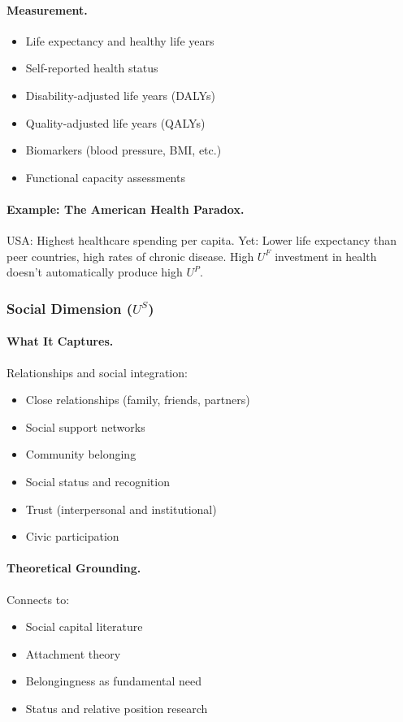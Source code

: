 \documentclass[12pt,a4paper]{article}
\begin{document}
\paragraph{Measurement.}
\begin{itemize}
  \item Life expectancy and healthy life years
  \item Self-reported health status
  \item Disability-adjusted life years (DALYs)
  \item Quality-adjusted life years (QALYs)
  \item Biomarkers (blood pressure, BMI, etc.)
  \item Functional capacity assessments
\end{itemize}

\paragraph{Example: The American Health Paradox.}
USA: Highest healthcare spending per capita.
Yet: Lower life expectancy than peer countries, high rates of chronic disease.
High $U^F$ investment in health doesn't automatically produce high $U^P$.

\subsubsection{Social Dimension ($U^S$)}

\paragraph{What It Captures.}
Relationships and social integration:
\begin{itemize}
  \item Close relationships (family, friends, partners)
  \item Social support networks
  \item Community belonging
  \item Social status and recognition
  \item Trust (interpersonal and institutional)
  \item Civic participation
\end{itemize}

\paragraph{Theoretical Grounding.}
Connects to:
\begin{itemize}
  \item Social capital literature \citep{putnam2000}
  \item Attachment theory
  \item Belongingness as fundamental need
  \item Status and relative position research
\end{itemize}
\end{document}

